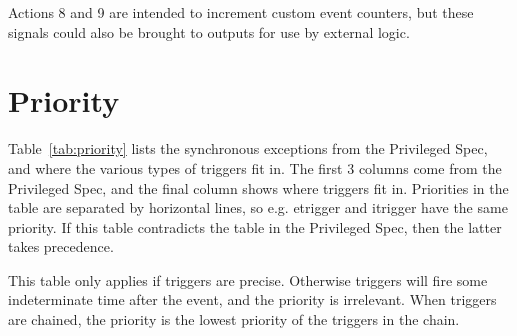 \begin{commentary}
    Actions 8 and 9 are intended to increment custom event counters, but these
    signals could also be brought to outputs for use by external logic.
\end{commentary}

\section{Priority}

Table~\ref{tab:priority} lists the synchronous exceptions from the Privileged
Spec, and where the various types of triggers fit in. The first 3 columns come
from the Privileged Spec, and the final column shows where triggers fit in.
Priorities in the table are separated by horizontal lines, so e.g. etrigger and
itrigger have the same priority.
If this table contradicts the table in the Privileged Spec, then the latter
takes precedence.

This table only applies if triggers are precise. Otherwise triggers
will fire some indeterminate time after the event, and the priority is
irrelevant.
When triggers are chained, the priority is the lowest priority of the triggers
in the chain.

